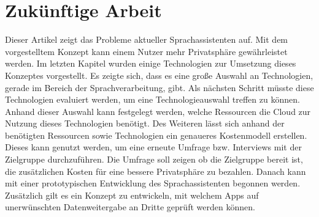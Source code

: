 \section{Zukünftige Arbeit}
Dieser Artikel zeigt das Probleme aktueller Sprachassistenten auf. Mit dem vorgestelltem Konzept kann einem Nutzer mehr Privatsphäre gewährleistet werden. Im letzten Kapitel wurden einige Technologien zur Umsetzung dieses Konzeptes vorgestellt. Es zeigte sich, dass es eine große Auswahl an Technologien, gerade im Bereich der Sprachverarbeitung, gibt. Als nächsten Schritt müsste diese Technologien evaluiert werden, um eine Technologieauswahl treffen zu können. Anhand dieser Auswahl kann festgelegt werden, welche Ressourcen die Cloud zur Nutzung dieses Technologien benötigt. Des Weiteren lässt sich anhand der benötigten Ressourcen sowie Technologien ein genaueres Kostenmodell erstellen. Dieses kann genutzt werden, um eine erneute Umfrage bzw. Interviews mit der Zielgruppe durchzuführen. Die Umfrage soll zeigen ob die Zielgruppe bereit ist, die zusätzlichen Kosten für eine bessere Privatsphäre zu bezahlen. Danach kann mit einer prototypischen Entwicklung des Sprachassistenten begonnen werden. Zusätzlich gilt es ein Konzept zu entwickeln, mit welchem Apps auf unerwünschten Datenweitergabe an Dritte geprüft werden können. 